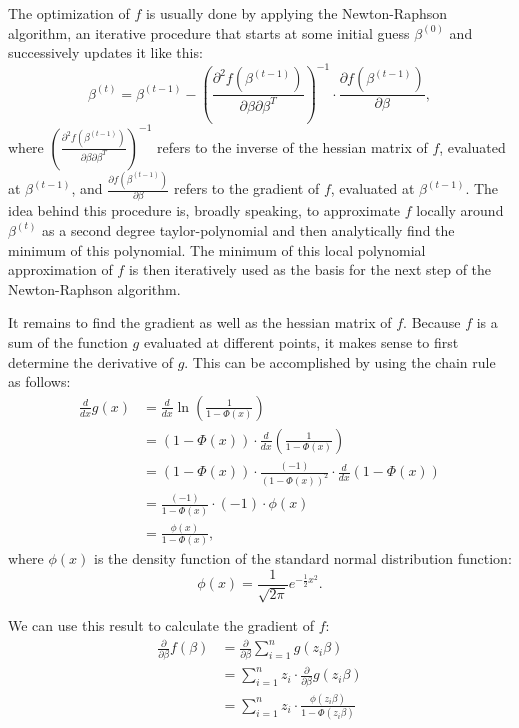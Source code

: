 The optimization of $f$ is usually done by applying the
Newton-Raphson algorithm, an iterative procedure that
starts at some initial guess $\beta^{(0)}$ and successively
updates it like this:
\begin{equation}
    \beta^{(t)} = \beta^{(t-1)} - \left(\frac{\partial^2f(\beta^{(t-1)})}{\partial\beta\partial\beta^T}\right)^{-1}
    \cdot \frac{\partial f(\beta^{(t-1)})}{\partial\beta},
\end{equation}
where $\left(\frac{\partial^2f(\beta^{(t-1)})}{\partial\beta\partial\beta^T}\right)^{-1}$
refers to the inverse of the hessian matrix of $f$, evaluated at
$\beta^{(t-1)}$, and $\frac{\partial f(\beta^{(t-1)})}{\partial\beta}$
refers to the gradient of $f$, evaluated at $\beta^{(t-1)}$.
The idea behind this procedure is, broadly speaking, to approximate
$f$ locally around $\beta^{(t)}$ as a second degree taylor-polynomial and then
analytically find the minimum of this polynomial. The minimum of this
local polynomial approximation of $f$ is then
iteratively used as the basis for the next step of the
Newton-Raphson algorithm.

It remains to find the gradient as well as the hessian matrix of $f$.
Because $f$ is a sum of the function $g$ evaluated at different points,
it makes sense to first determine the derivative of $g$.
This can be accomplished by using the chain rule as follows:
\begin{equation}
    \begin{split}
        \frac{d}{dx}g(x)
        & = \frac{d}{dx} \ln \left(\frac{1}{1 - \Phi(x)}\right)                 \\
        & = (1 - \Phi(x)) \cdot \frac{d}{dx} \left(\frac{1}{1 - \Phi(x)}\right) \\
        & = (1 - \Phi(x)) \cdot \frac{(-1)}{(1 - \Phi(x))^2} \cdot \frac{d}{dx} (1 - \Phi(x)) \\
        & = \frac{(-1)}{1 - \Phi(x)} \cdot (-1) \cdot \phi(x) \\
        & = \frac{\phi(x)}{1 - \Phi(x)},
    \end{split}
\end{equation}
where $\phi(x)$ is the density function of the standard normal distribution function:
\begin{equation*}
    \phi(x) = \frac{1}{\sqrt{2 \pi}} e^{-\frac{1}{2} x^2}.
\end{equation*}

\noindent We can use this result to calculate the gradient of $f$:
\begin{equation}
    \begin{split}
        \frac{\partial}{\partial \beta} f(\beta)
        & = \frac{\partial}{\partial \beta} \sum_{i=1}^n g(z_i \beta) \\
        & = \sum_{i=1}^n z_i \cdot \frac{\partial}{\partial \beta} g(z_i \beta) \\
        & = \sum_{i=1}^n z_i \cdot \frac{\phi(z_i\beta)}{1 - \Phi(z_i \beta)}
    \end{split}
\end{equation}

